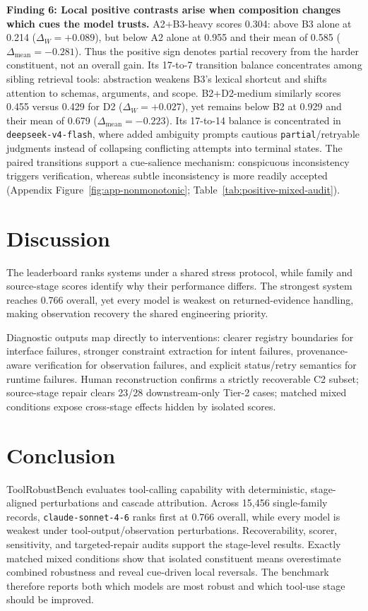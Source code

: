 \documentclass[11pt]{article}
\newcommand{\ToolRobustBench}{ToolRobustBench\xspace}
\begin{document}
\noindent\textbf{Finding 6: Local positive contrasts arise when composition changes which cues the model trusts.}
A2+B3-heavy scores 0.304: above B3 alone at 0.214 ($\Delta_W=+0.089$), but below A2 alone at 0.955 and their mean of 0.585 ($\Delta_{\mathrm{mean}}=-0.281$). Thus the positive sign denotes partial recovery from the harder constituent, not an overall gain. Its 17-to-7 transition balance concentrates among sibling retrieval tools: abstraction weakens B3's lexical shortcut and shifts attention to schemas, arguments, and scope. B2+D2-medium similarly scores 0.455 versus 0.429 for D2 ($\Delta_W=+0.027$), yet remains below B2 at 0.929 and their mean of 0.679 ($\Delta_{\mathrm{mean}}=-0.223$). Its 17-to-14 balance is concentrated in \texttt{deepseek-v4-flash}, where added ambiguity prompts cautious \texttt{partial}/retryable judgments instead of collapsing conflicting attempts into terminal states. The paired transitions support a cue-salience mechanism: conspicuous inconsistency triggers verification, whereas subtle inconsistency is more readily accepted (Appendix Figure~\ref{fig:app-nonmonotonic}; Table~\ref{tab:positive-mixed-audit}).

\section{Discussion}

The leaderboard ranks systems under a shared stress protocol, while family and source-stage scores identify why their performance differs. The strongest system reaches 0.766 overall, yet every model is weakest on returned-evidence handling, making observation recovery the shared engineering priority.

Diagnostic outputs map directly to interventions: clearer registry boundaries for interface failures, stronger constraint extraction for intent failures, provenance-aware verification for observation failures, and explicit status/retry semantics for runtime failures. Human reconstruction confirms a strictly recoverable C2 subset; source-stage repair clears 23/28 downstream-only Tier-2 cases; matched mixed conditions expose cross-stage effects hidden by isolated scores.

\section{Conclusion}

\ToolRobustBench{} evaluates tool-calling capability with deterministic, stage-aligned perturbations and cascade attribution. Across 15,456 single-family records, \texttt{claude-sonnet-4-6} ranks first at 0.766 overall, while every model is weakest under tool-output/observation perturbations. Recoverability, scorer, sensitivity, and targeted-repair audits support the stage-level results. Exactly matched mixed conditions show that isolated constituent means overestimate combined robustness and reveal cue-driven local reversals. The benchmark therefore reports both which models are most robust and which tool-use stage should be improved.
\end{document}
